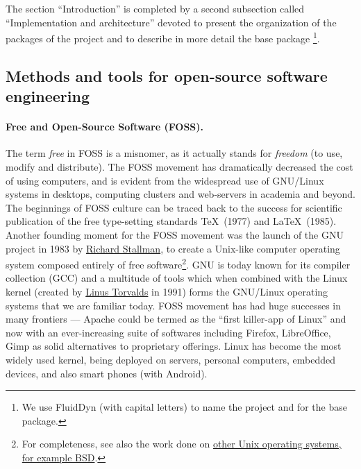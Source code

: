 The section ``Introduction'' is completed by a second subsection called
``Implementation and architecture'' devoted to present the organization of the
packages of the project and to describe in more detail the base package
\fluiddyn\footnote{We use FluidDyn (with capital letters) to name the project and
\fluiddyn for the base package.}.

\subsection{Methods and tools for open-source software engineering}

\paragraph{Free and Open-Source Software (FOSS).} The term \emph{free} in
FOSS is a misnomer, as it actually stands for \emph{freedom} (to use, modify
and distribute). The FOSS movement has dramatically decreased the cost of using
computers, and is evident from the widespread use of GNU/Linux systems in
desktops, computing clusters and web-servers in academia and beyond.
%
The beginnings of FOSS culture can be traced back to the success for scientific
publication of the free type-setting standards \TeX\ (1977) and \LaTeX\ (1985).
%
Another founding moment for the FOSS movement was the launch of the GNU project
in 1983 by \href{https://en.wikipedia.org/wiki/Richard_Stallman}{Richard
Stallman}, to create a Unix-like computer operating system composed entirely of
free software\footnote{For completeness, see also the work done on
\href{https://www.levenez.com/unix/}{other Unix operating systems,
for example BSD}.}.
%
GNU is today known for its compiler collection (GCC) and a multitude of tools
which when combined with the Linux kernel (created by
\href{https://en.wikipedia.org/wiki/Linus_Torvalds}{Linus Torvalds} in 1991)
forms the GNU/Linux operating systems that we are familiar today.
%
FOSS movement has had huge successes in many frontiers --- Apache could be
termed as the ``first killer-app of Linux'' and now with an ever-increasing
suite of softwares including Firefox, LibreOffice, Gimp as solid alternatives
to proprietary offerings.
%
Linux has become the most widely used kernel, being deployed on servers,
personal computers, embedded devices, and also smart phones (with Android).


